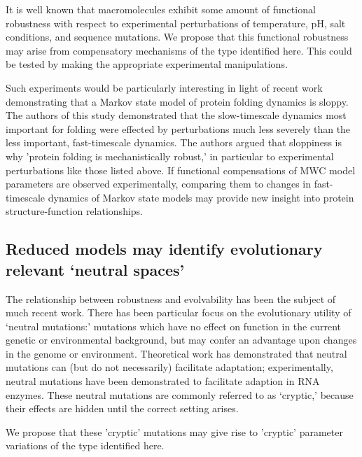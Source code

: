 \documentclass[10pt]{amsart}
\begin{document}
It is well known that macromolecules exhibit some amount of functional robustness with respect to experimental perturbations of temperature, pH, salt conditions, and sequence mutations.  We propose that this functional robustness may arise from compensatory mechanisms of the type identified here.  This could be tested by making the appropriate experimental manipulations.

Such experiments would be particularly interesting in light of recent work demonstrating that a Markov state model of protein folding dynamics is sloppy.  The authors of this study demonstrated that the slow-timescale dynamics most important for folding were effected by perturbations much less severely than the less important, fast-timescale dynamics.  The authors argued that sloppiness is why 'protein folding is mechanistically robust,' in particular to experimental perturbations like those listed above.  If functional compensations of MWC model parameters are observed experimentally, comparing them to changes in fast-timescale dynamics of Markov state models may provide new insight into protein structure-function relationships.

\subsection{Reduced models may identify evolutionary relevant `neutral spaces'}

The relationship between robustness and evolvability has been the subject of much recent work.  There has been particular focus on the evolutionary utility of `neutral mutations:' mutations which have no effect on function in the current genetic or environmental background, but may confer an advantage upon changes in the genome or environment.  Theoretical work has demonstrated that neutral mutations can (but do not necessarily) facilitate adaptation; experimentally, neutral mutations have been demonstrated to facilitate adaption in RNA enzymes.  These neutral mutations are commonly referred to as `cryptic,' because their effects are hidden until the correct setting arises.

We propose that these 'cryptic' mutations may give rise to 'cryptic' parameter variations of the type identified here.
\end{document}
